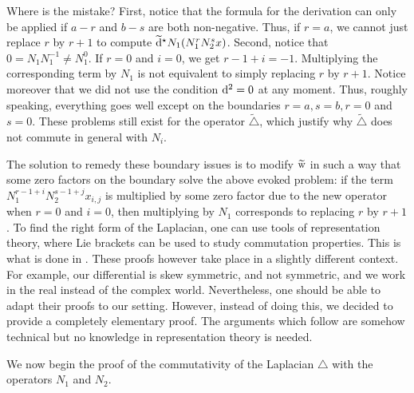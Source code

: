 \documentclass[11pt]{amsart}
\theoremstyle{definition}
\newenvironment{remark}
  {\pushQED{\qed}\renewcommand{\qedsymbol}{$\diamond$}\remm}
  {\popQED\endremm}
\numberwithin{equation}{section}
\renewcommand{\~}{\widetilde}
\newcommand{\dual}{\star} %
\renewcommand{\d}{{\rm d}} %
\newcommand{\dd}{\d^\dual} %
\newcommand{\Lap}{\triangle} %
\newcommand{\w}{{\rm w}} %
\begin{document}
{\begin{remark}
Where is the mistake? First, notice that the formula for the derivation can only be applied if $a-r$ and $b-s$ are both non-negative. Thus, if $r=a$, we cannot just replace $r$ by $r+1$ to compute $\~\dd N_1(N_1^rN_2^sx)$. Second, notice that $0=N_1N_1^{-1}\neq N_1^{0}$. If $r=0$ and $i=0$, we get $r-1+i=-1$. Multiplying the corresponding term by $N_1$ is not equivalent to simply replacing $r$ by $r+1$. Notice moreover that we did not use the condition $\d^2=0$ at any moment. Thus, roughly speaking, everything goes well except on the boundaries $r=a, s=b, r=0$ and $s=0$. These problems still exist for the operator $\~\Lap$, which justify why $\~\Lap$ does not commute in general with $N_i$.

\medskip

The solution to remedy these boundary issues is to modify $\~\w$ in such a way that some zero factors on the boundary solve the above evoked problem: if the term $N_1^{r-1+i}N_2^{s-1+j}x_{i,j}$ is multiplied by some zero factor due to the new operator when $r=0$ and $i=0$, then multiplying by $N_1$ corresponds to replacing $r$ by $r+1$. To find the right form of the Laplacian, one can use tools of representation theory, where Lie brackets can be used to study commutation properties. This is what is done in \cites{GNA90, SabSch}. These proofs however take place in a slightly different context. For example, our differential is skew symmetric, and not symmetric, and we work in the real instead of the complex world. Nevertheless, one should be able to adapt their proofs to our setting. However, instead of doing this, we decided to provide a completely elementary proof. The arguments which follow are somehow technical but no knowledge in representation theory is needed. \end{remark}

\medskip

We now begin the proof of the commutativity of the Laplacian $\Lap$ with the operators $N_1$ and $N_2$.

\medskip

}
\end{document}
